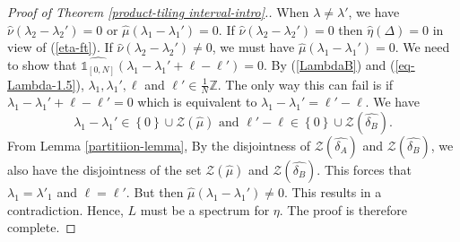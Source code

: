 \documentclass[reqno,a4paper,12pt]{amsart}
\numberwithin{equation}{section}
\newcommand{\Set}[1]{{\left\{{#1}\right\}}}
\newcommand{\ZZ}{{\mathbb Z}}
\newcommand{\ft}[1]{\widehat{#1}}
\newcounter{rem}
\theoremstyle{remark}
\numberwithin{equation}{section}
\def\orange{\org}
\def\org#1{\textcolor[rgb]{1.0, 0.5, 0.00}{#1}}
\def\red#1{\textcolor[rgb]{1.00,0.00,0.00}{#1}}
\begin{document}
{\begin{proof}[Proof of Theorem \ref{product-tiling interval-intro}.]
When $\lambda\ne\lambda'$, we have $\ft{\nu}(\lambda_2-\lambda_2')=0$ or $\ft{\mu}(\lambda_1-\lambda_1')=0$.  If $\ft\nu(\lambda_2-\lambda_2') = 0$ then $\widehat{\eta}(\Delta)=0$ in view of (\ref{eta-ft}). If $\ft\nu(\lambda_2-\lambda_2') \ne 0$,  we  must have $\ft{\mu}(\lambda_1-\lambda_1')=0$. We need to show that $\ft{\mathds{1}_{[0, N]}}(\lambda_1-\lambda_1'+\ell-\ell') = 0$. By (\ref{LambdaB}) and (\ref{eq-Lambda-1.5}),  $\lambda_1, \lambda_1', \ell$ and $\ell' \in \frac1N\ZZ$. The only way this can fail is if $\lambda_1-\lambda_1'+\ell-\ell'= 0$ which is equivalent to $\lambda_1-\lambda_1' = \ell'-\ell$. We have
$$
\lambda_1-\lambda_1' \in \Set{0} \cup {\mathcal Z}(\ft\mu) \text{ and }
\ell'-\ell \in \Set{0} \cup {\mathcal Z}(\ft{\delta_B}).
$$
From Lemma \ref{partitiion-lemma}, By the disjointness of ${\mathcal Z}(\ft{\delta_A})$ and ${\mathcal Z}(\ft{\delta_B})$, we also have the disjointness of the set ${\mathcal Z}(\ft\mu)$ and ${\mathcal Z}(\ft{\delta_B})$. This forces that  $\lambda_1=\lambda'_1$ and $\ell = \ell'$. But then $\ft{\mu}(\lambda_1-\lambda_1')\ne 0$. This results in a contradiction. Hence, $L$ must be a spectrum for $\eta$. The proof is therefore complete. 
\end{proof}


}
\end{document}
